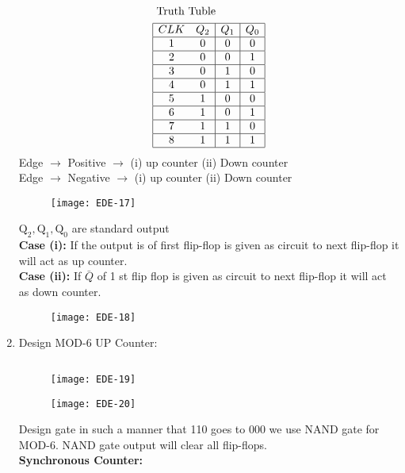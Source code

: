 \begin{enumerate}
\begin{align*}
	&\text { Truth Tuble }\\
	&\begin{array}{|cc|c|c|}
		\hline C L K & Q_{2} & Q_{1} & Q_{0} \\
		\hline 1 & 0 & 0 & 0 \\
		\hline 2 & 0 & 0 & 1 \\
		\hline 3 & 0 & 1 & 0 \\
		\hline 4 & 0 & 1 & 1 \\
		\hline 5 & 1 & 0 & 0 \\
		\hline 6 & 1 & 0 & 1 \\
		\hline 7 & 1 & 1 & 0 \\
		\hline 8 & 1 & 1 & 1 \\
		\hline
	\end{array}
\end{align*}
 	Edge $\rightarrow$ Positive $\rightarrow$ (i) up counter (ii) Down counter \\
 	Edge $\rightarrow$ Negative $\rightarrow$ (i) up counter (ii) Down counter
 	\begin{figure}[H]
 		\centering
 		\texttt{[image: EDE-17]}
 	\end{figure}
 	$\mathrm{Q}_{2}, \mathrm{Q}_{1}, \mathrm{Q}_{0}$ are standard output\\
 	\textbf{Case (i):} If the output is of first flip-flop is given as circuit to next flip-flop it will act as up counter.\\
 	\textbf{Case (ii):} If $\bar{Q}$ of 1 st flip flop is given as circuit to next flip-flop it will act as down counter.
 	\begin{figure}[H]
 	\centering
 	\texttt{[image: 	EDE-18]}
 \end{figure}
 	\item Design MOD-6 UP Counter:
 	\begin{answer}	$\left. \right. $\\
 		\begin{figure}[H]
 			\centering
 			\texttt{[image: EDE-19]}
 		\end{figure}
 		\begin{figure}[H]
 		\centering
 		\texttt{[image: EDE-20]}
 	\end{figure}
 		Design gate in such a manner that 110 goes to 000 we use NAND gate for MOD-6. NAND gate output will clear all flip-flops.\\
 		\textbf{Synchronous Counter:}\\

\end{answer}
\end{enumerate}
